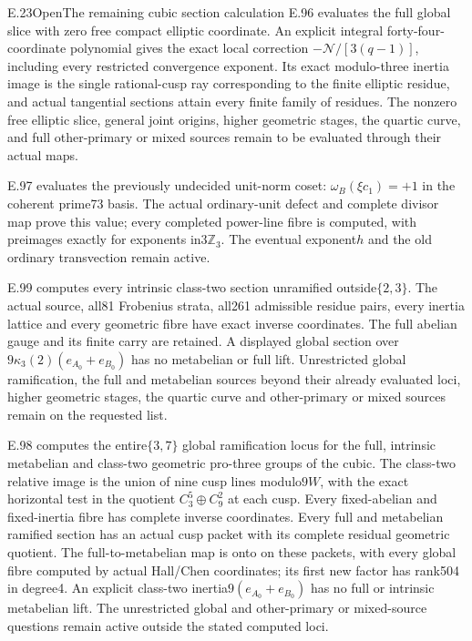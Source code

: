 \begin{statement}{E.23}{Open}{The remaining cubic section calculation}
E.96 evaluates the full global slice with zero free compact
elliptic coordinate. An explicit integral forty-four-coordinate
polynomial gives the exact local correction
\(-\mathcal N/[3(q-1)]\), including every restricted
convergence exponent. Its exact modulo-three inertia image
is the single rational-cusp ray corresponding to the finite
elliptic residue, and actual tangential sections attain
every finite family of residues. The nonzero free elliptic
slice, general joint origins, higher geometric stages,
the quartic curve, and full other-primary or mixed sources
remain to be evaluated through their actual maps.


E.97 evaluates the previously undecided unit-norm coset:
$\omega_B(\xi c_1)=+1$ in the coherent prime73 basis.
The actual ordinary-unit defect and complete divisor map
prove this value; every completed power-line fibre is
computed, with preimages exactly for exponents in$3\mathbb Z_3$.
The eventual exponent$h$ and the old ordinary transvection
remain active.

E.99 computes every intrinsic class-two section unramified
outside$\{2,3\}$. The actual source, all81 Frobenius
strata, all261 admissible residue pairs, every inertia
lattice and every geometric fibre have exact inverse
coordinates. The full abelian gauge and its finite carry
are retained. A displayed global section over
$9\kappa_3(2)(e_{A_0}+e_{B_0})$ has no metabelian or
full lift. Unrestricted global ramification, the full and
metabelian sources beyond their already evaluated loci,
higher geometric stages, the quartic curve and other-primary
or mixed sources remain on the requested list.


E.98 computes the entire$\{3,7\}$ global ramification
locus for the full, intrinsic metabelian and class-two
geometric pro-three groups of the cubic. The class-two
relative image is the union of nine cusp lines modulo$9W$,
with the exact horizontal test in the quotient
$C_3^5\oplus C_9^2$ at each cusp. Every fixed-abelian
and fixed-inertia fibre has complete inverse coordinates.
Every full and metabelian ramified section has an actual
cusp packet with its complete residual geometric quotient.
The full-to-metabelian map is onto on these packets,
with every global fibre computed by actual Hall/Chen
coordinates; its first new factor has rank504 in degree4.
An explicit class-two inertia$9(e_{A_0}+e_{B_0})$ has
no full or intrinsic metabelian lift. The unrestricted
global and other-primary or mixed-source questions
remain active outside the stated computed loci.



\end{statement}
